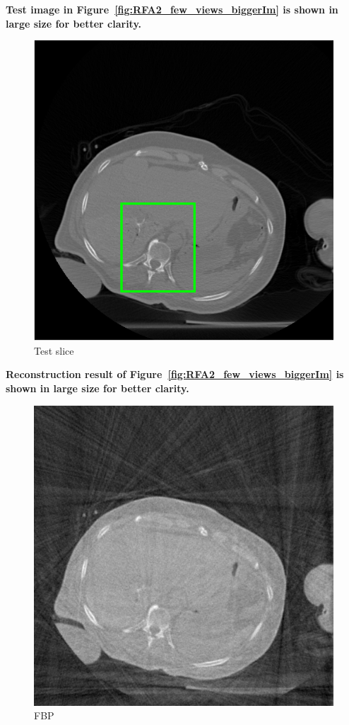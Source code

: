 \documentclass{article}
\begin{document}
\textbf{Test image in Figure~\ref{fig:RFA2_few_views_biggerIm}  is shown in large size for better clarity.}\\
\begin{figure}[!h]
\centering
\includegraphics[width=1.2\columnwidth]{../images/tmh/RFA2/few_views/colorTestIm.png}
\captionsetup{labelformat=empty}
\caption[Representative results-2]{\large{Test slice}}
\label{fig:RFA2_few_views_bigger}
\end{figure}
\newpage
\textbf{Reconstruction result of Figure~\ref{fig:RFA2_few_views_biggerIm}   is shown in large size for better clarity.}\\
\begin{figure}[!h]
\centering
\includegraphics[width=1.2\columnwidth]{../images/tmh/RFA2/few_views/fbp.png}
\captionsetup{labelformat=empty}
\caption[Representative results-2]{\large{FBP}}
\label{fig:RFA2_few_views_bigger}
\end{figure}
\end{document}
